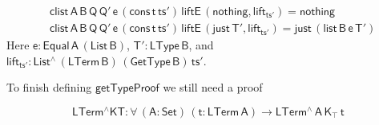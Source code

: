 \documentclass[9pt]{entcs}
\begin{document}
\begin{align*}
  &\mathsf{clist\, A\, B\, Q\, Q'\, e\, (cons\, t\, ts') \, liftE\,
    (nothing , lift_{ts'}) = nothing} \\ 
  &\mathsf{clist\, A\, B\, Q\, Q'\, e\, (cons\, t\, ts') \, liftE\,
    (just\, T' , lift_{ts'}) = just \, (list\, B\, e\, T')} 
\end{align*}
Here $\mathsf{e : Equal\, A\, (List\,B)}$, $\mathsf{T' : LType\, B}$,
and $\mathsf{lift_{ts'} : List^{\wedge}\, (LTerm\, B)\, (GetType\,
  B)\, ts'}$.

\pagebreak

To finish defining $\mathsf{getTypeProof}$ we still need a proof

\vspace*{-0.1in}

\[ \mathsf{LTerm^\wedge KT : \forall\, (A : Set)\, (t : LTerm\, A) \to
  LTerm^{\wedge}\, A\, K_\top\,t} \]

\vspace*{-0.05in}
\end{document}
